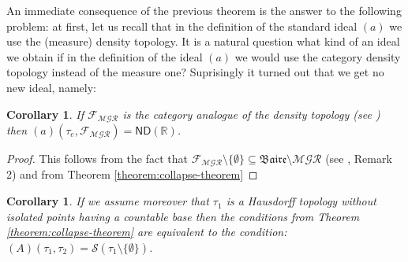 \documentclass[12pt]{amsart}
\theoremstyle{plain}
\newtheorem{corollary}[theorem]{Corollary}
\theoremstyle{definition}
\theoremstyle{remark}
\newcommand{\Baire}{\mathfrak{Baire}}
\newcommand{\cl}{\mathit{cl}}
\newcommand{\meager}{{\mathcal{MGR}}}
\newcommand{\real}{\mathbb{R}}
\newcommand{\cF}{{\mathcal F}}
\newcommand{\cK}{{\mathcal K}}
\newcommand{\cS}{{\mathcal S}}
\newcommand{\mathint}{\mathit{int}}
\newcommand{\aideal}{\mathit{(a)}}
\newcommand{\Afield}{\mathit{(A)}}
\newcommand{\topWithoutEmptyset}[1]{#1\setminus\lbrace\emptyset\rbrace}
\begin{document}
An immediate consequence of the previous theorem is the answer to the following
problem: at first, let us recall that in the definition of the standard ideal $\aideal$
we use the (measure) density topology. It is a natural question what kind of an ideal
we obtain if in the definition of the ideal $\aideal$ we would use the category density topology
instead of the measure one? Suprisingly it turned out that we get no new ideal, namely:
\begin{corollary}
\label{corollary:category-density-topology}
If $\cF_{\meager}$ is the category analogue of the density topology (see \cite{PWBW}) 
then 
$(a)(\tau_e, \cF_{\meager}) = \mathsf{ND}(\real)$.
\end{corollary}

\begin{proof}
This follows from the fact that 
$\cF_{\meager} \setminus\lbrace\emptyset\rbrace\subseteq \Baire\setminus\meager$
(see \cite{PWBW}, Remark 2) and
from Theorem \ref{theorem:collapse-theorem}
\end{proof}

\begin{corollary}
If we assume moreover that $\tau_1$ is a Hausdorff topology without isolated points
having a countable base then the conditions from Theorem \ref{theorem:collapse-theorem} are equivalent to
the condition: $\Afield(\tau_1, \tau_2) = \cS(\tau_1 \setminus \lbrace \emptyset \rbrace)$.
\end{corollary}
\end{document}
